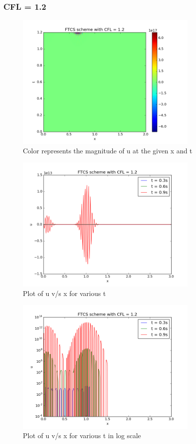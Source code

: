 \documentclass[11pt, a4paper]{article}
\begin{document}
\subsubsection{CFL = 1.2}
\begin{figure}[H]
 \centering
 \includegraphics[width = 0.8\textwidth]{FTCS3_12.png}
 \caption{Color represents the magnitude of u at the given x and t}
\end{figure}

\begin{figure}[H]
 \centering
 \includegraphics[width = 0.8\textwidth]{FTCS3_12_1.png}
 \caption{Plot of u v/s x for various t}
\end{figure}

\begin{figure}[H]
 \centering
 \includegraphics[width = 0.8\textwidth]{FTCS3_12_1_log.png}
 \caption{Plot of u v/s x for various t in log scale}
\end{figure}
\end{document}
